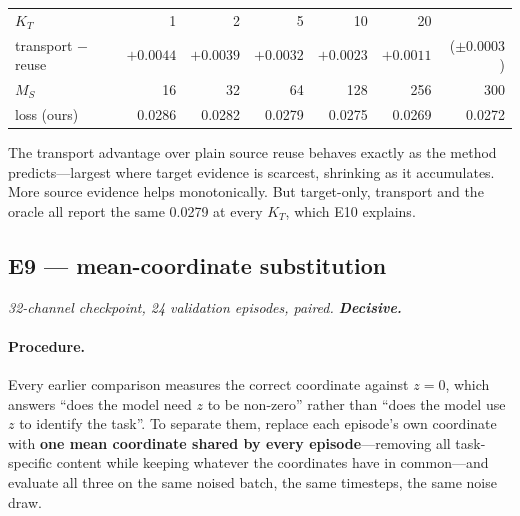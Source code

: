 \documentclass[11pt]{article}
\newcommand{\KT}{K_{T}}
\newcommand{\MS}{M_{S}}
\begin{document}
\begin{center}\small
\begin{tabular}{@{}lrrrrrr@{}}
\toprule
$\KT$ & 1 & 2 & 5 & 10 & 20 & \\
transport $-$ reuse & $+0.0044$ & $+0.0039$ & $+0.0032$ & $+0.0023$ & $+0.0011$ & ($\pm0.0003$) \\
\midrule
$\MS$ & 16 & 32 & 64 & 128 & 256 & 300 \\
loss (ours) & 0.0286 & 0.0282 & 0.0279 & 0.0275 & 0.0269 & 0.0272 \\
\bottomrule
\end{tabular}
\end{center}

The transport advantage over plain source reuse behaves exactly as the method predicts---largest
where target evidence is scarcest, shrinking as it accumulates. More source evidence helps
monotonically. But target-only, transport and the oracle all report the same 0.0279 at every $\KT$,
which E10 explains.

\subsection{E9 --- mean-coordinate substitution}

\textit{32-channel checkpoint, 24 validation episodes, paired. \textbf{Decisive.}}

\paragraph{Procedure.} Every earlier comparison measures the correct coordinate against $z=0$,
which answers ``does the model need $z$ to be non-zero'' rather than ``does the model use $z$ to
identify the task''. To separate them, replace each episode's own coordinate with \textbf{one mean
coordinate shared by every episode}---removing all task-specific content while keeping whatever the
coordinates have in common---and evaluate all three on the same noised batch, the same timesteps,
the same noise draw.
\end{document}
